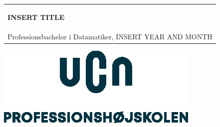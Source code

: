 %
\begin{titlepage}
\pagecolor{ucngrey}\afterpage{\nopagecolor}

\vspace*{\fill}

  \addtolength{\hoffset}{0.5\evensidemargin-0.5\oddsidemargin} %
  \noindent%
  {\color{white}\colorbox{ucnblue}{\begin{tabular}{@{}p{\textwidth}@{}}
    \begin{center}
    \Huge{\textbf{
      INSERT TITLE%
    }}
    \end{center}
    \begin{center}
      \Large{
      }
    \end{center}
    \vspace{0.2cm}
   \begin{center}
    {\Large
      Benyad Jomhur, Lucca Christiansen, Alexandra Østermark, Søren Ravn%
    }\\
    \vspace{0.2cm}
    {\large
    Professionsbachelor i Datamatiker, INSERT YEAR AND MONTH%
    }
   \end{center}
   \vspace{0.2cm}
   \begin{center}
    {\Large
      THE TYPE OF PROJECT
    }
   \end{center}
  \end{tabular}}}
  \vfill
  \begin{center}
    \includegraphics[width=0.2\paperwidth]{figures/formalities/UCN-hovedlogo}
  \end{center}
\end{titlepage}
\clearpage